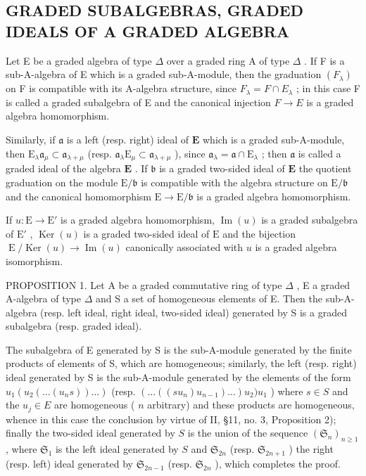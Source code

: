 \subsection{GRADED SUBALGEBRAS, GRADED IDEALS OF A GRADED ALGEBRA}

Let E be a graded algebra of type \(\Delta\) over a graded ring A of type \(\Delta\) . If F is a sub-A-algebra of E which is a graded sub-A-module, then the graduation \((F_{\lambda})\) on F is compatible with its A-algebra structure, since \(F_{\lambda} = F \cap E_{\lambda}\) ; in this case F is called a graded subalgebra of E and the canonical injection \(F \to E\) is a graded algebra homomorphism.

Similarly, if \(\mathfrak{a}\) is a left (resp. right) ideal of \(\mathbf{E}\) which is a graded sub-A-module, then \(\mathrm{E}_{\lambda}\mathfrak{a}_{\mu} \subset \mathfrak{a}_{\lambda + \mu}\) (resp. \(\mathfrak{a}_{\lambda}\mathrm{E}_{\mu} \subset \mathfrak{a}_{\lambda + \mu}\) ), since \(\mathfrak{a}_{\lambda} = \mathfrak{a} \cap \mathrm{E}_{\lambda}\) ; then \(\mathfrak{a}\) is called a graded ideal of the algebra \(\mathbf{E}\) . If \(\mathfrak{b}\) is a graded two-sided ideal of \(\mathbf{E}\) the quotient graduation on the module \(\mathrm{E} / \mathfrak{b}\) is compatible with the algebra structure on \(\mathrm{E} / \mathfrak{b}\) and the canonical homomorphism \(\mathrm{E} \to \mathrm{E} / \mathfrak{b}\) is a graded algebra homomorphism.

If \(u: \mathrm{E} \to \mathrm{E}'\) is a graded algebra homomorphism, \(\operatorname{Im}(u)\) is a graded subalgebra of \(\mathrm{E}'\) , \(\operatorname{Ker}(u)\) is a graded two-sided ideal of \(\mathrm{E}\) and the bijection \(\operatorname{E} / \operatorname{Ker}(u) \to \operatorname{Im}(u)\) canonically associated with \(u\) is a graded algebra isomorphism.

PROPOSITION 1. Let A be a graded commutative ring of type \(\Delta\) , E a graded A-algebra of type \(\Delta\) and S a set of homogeneous elements of E. Then the sub-A-algebra (resp. left ideal, right ideal, two-sided ideal) generated by S is a graded subalgebra (resp. graded ideal).

The subalgebra of E generated by S is the sub-A-module generated by the finite products of elements of S, which are homogeneous; similarly, the left (resp. right) ideal generated by S is the sub-A-module generated by the elements of the form \(u_{1}(u_{2}(\ldots(u_{n}s))\ldots)\) (resp. \((\ldots((su_{n})u_{n-1})\ldots)u_{2})u_{1}\) ) where \(s \in S\) and the \(u_{j} \in E\) are homogeneous ( \(n\) arbitrary) and these products are homogeneous, whence in this case the conclusion by virtue of II, §11, no. 3, Proposition 2); finally the two-sided ideal generated by \(S\) is the union of the sequence \((\mathfrak{S}_{n})_{n \geqslant 1}\) , where \(\mathfrak{S}_{1}\) is the left ideal generated by \(S\) and \(\mathfrak{S}_{2n}\) (resp. \(\mathfrak{S}_{2n+1}\) ) the right (resp. left) ideal generated by \(\mathfrak{S}_{2n-1}\) (resp. \(\mathfrak{S}_{2n}\) ), which completes the proof.

